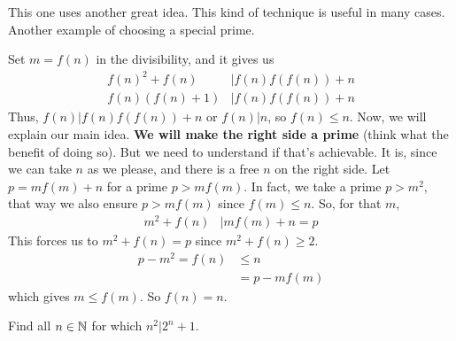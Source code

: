 \documentclass[problems.tex]{subfile}
\begin{document}
	\begin{solution}[Second]
		This one uses another great idea. This kind of technique is useful in many cases. Another example of choosing a special prime.
		
		Set $m=f(n)$ in the divisibility, and it gives us
		\begin{align*}
		f(n)^2+f(n) & |f(n)f(f(n))+n\\
		f(n)(f(n)+1)& | f(n)f(f(n))+n
		\end{align*}
		Thus, $f(n)|f(n)f(f(n))+n$ or $f(n)|n$, so $f(n)\leq n$. Now, we will explain our main idea. \textbf{We will make the right side a prime} (think what the benefit of doing so). But we need to understand if that's achievable. It is, since we can take $n$ as we please, and there is a free $n$ on the right side. Let $p=mf(m)+n$ for a prime $p>mf(m)$. In fact, we take a prime $p>m^2$, that way we also ensure $p>mf(m)$ since $f(m)\leq n$. So, for that $m$,
			\begin{align*}
				m^2+f(n) & |mf(m)+n=p
			\end{align*}
		This forces us to $m^2+f(n)=p$ since $m^2+f(n)\geq2$.
			\begin{align*}
				p-m^2 = f(n) & \leq n\\
							 & = p-mf(m)
			\end{align*}
		which gives $m\leq f(m)$. So $f(n)=n$.
	\end{solution}
	
	\begin{problem}
		Find all $n\in\mathbb{N}$ for which $n^2|2^n+1$.
	\end{problem}
	
\end{document}
